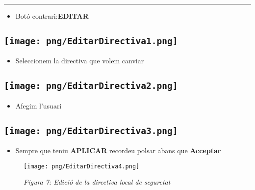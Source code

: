 \documentclass[
  a4paper,
]{article}
\providecommand{\tightlist}{%
  \setlength{\itemsep}{0pt}\setlength{\parskip}{0pt}}
\begin{document}
\begin{center}\rule{0.5\linewidth}{0.5pt}\end{center}

\begin{itemize}
\tightlist
\item
  Botó contrari:\textbf{EDITAR}
\end{itemize}

\subsection{\texorpdfstring{\protect\texttt{[image: png/EditarDirectiva1.png]}}{Figura 4: Edició de la directiva local de seguretat}}\label{figura-4-ediciuxf3-de-la-directiva-local-de-seguretat}

\begin{itemize}
\tightlist
\item
  Seleccionem la directiva que volem canviar
\end{itemize}

\subsection{\texorpdfstring{\protect\texttt{[image: png/EditarDirectiva2.png]}}{Figura 5: Edició de la directiva local de seguretat}}\label{figura-5-ediciuxf3-de-la-directiva-local-de-seguretat}

\begin{itemize}
\tightlist
\item
  Afegim l'usuari
\end{itemize}

\subsection{\texorpdfstring{\protect\texttt{[image: png/EditarDirectiva3.png]}}{Figura 6: Edició de la directiva local de seguretat}}\label{figura-6-ediciuxf3-de-la-directiva-local-de-seguretat}

\begin{itemize}
\tightlist
\item
  Sempre que teniu \textbf{APLICAR} recordeu polsar abans que
  \textbf{Acceptar}
\end{itemize}

\begin{figure}
\centering
\texttt{[image: png/EditarDirectiva4.png]}
\caption{\emph{Figura 7: Edició de la directiva local de seguretat}}
\end{figure}
\end{document}
